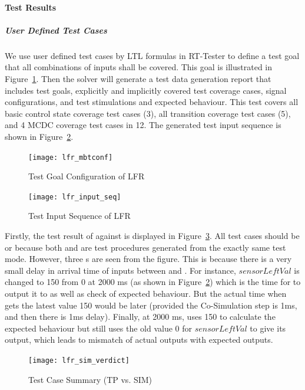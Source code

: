 \paragraph{Test Results}
\subparagraph{User Defined Test Cases}

We use user defined test cases by LTL formulas in RT-Tester to define a test goal that all combinations of inputs shall be covered. This goal is illustrated in Figure~\ref{fig:lfr_mbtconf}. Then the solver will generate a test data generation report that includes test goals, explicitly and implicitly covered test coverage cases, signal configurations, and test stimulations and expected behaviour. This test covers all basic control state coverage test cases (3), all transition coverage test cases (5), and 4 MCDC coverage test cases in 12. The generated test input sequence is shown in Figure~\ref{fig:lfr_test_seq}.
\begin{figure}[htb!]
    \centering
	\texttt{[image: lfr\_mbtconf]}
    \caption{Test Goal Configuration of LFR}
    \label{fig:lfr_mbtconf}
\end{figure}

\begin{figure}[htb!]
    \centering
	\texttt{[image: lfr\_input\_seq]}
    \caption{Test Input Sequence of LFR}
    \label{fig:lfr_test_seq}
\end{figure}

Firstly, the test result of  against  is displayed in Figure~\ref{fig:lfr_testcase_sum_sim}. All test cases should be  or  because both  and  are test procedures generated from the exactly same test mode. However, three s are seen from the figure. This is because there is a very small delay in arrival time of inputs between  and . For instance, $sensorLeftVal$ is changed to 150 from 0 at 2000 ms (as shown in Figure~\ref{fig:lfr_test_seq}) which is the time for  to output it to  as well as check of expected behaviour. But the actual time when  gets the latest value 150 would be later (provided the Co-Simulation step is 1ms, and then there is 1ms delay). Finally, at 2000 ms,  uses 150 to calculate the expected behaviour but  still uses the old value 0 for $sensorLeftVal$ to give its output, which leads to mismatch of actual outputs with expected outputs. 
\begin{figure}[htb!]
    \centering
	\texttt{[image: lfr\_sim\_verdict]}
    \caption{Test Case Summary (TP vs. SIM)}
    \label{fig:lfr_testcase_sum_sim}
\end{figure}

